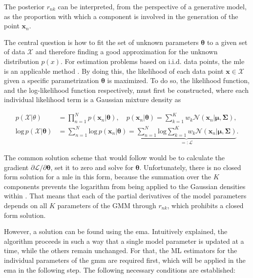 \documentclass[../../../main.tex]{subfiles}
\begin{document}
The posterior $r_{nk}$ can be interpreted, from the perspective of a generative model, as the proportion with which a component is involved in the generation of the point $\bm{x}_n$.

The central question is how to fit the set of unknown parameters $\bm{\theta}$ to a given set of data $\mathcal{X}$ and therefore finding a good approximation for the unknown distribution $p(x)$. For estimation problems based on i.i.d. data points, the \gls{mle} is an applicable method \cite[p. 317]{dei_2020}. By doing this, the likelihood of each data point $\bm{x} \in \mathcal{X}$ given a specific parametrization $\bm{\theta}$ is maximized. To do so, the likelihood function, and the log-likelihood function respectively, must first be constructed, where each individual likelihood term is a Gaussian mixture density as

\begin{equation*}
    \begin{aligned}
        p(\mathcal{X}|\theta) &= \prod\limits_{n=1}^Np(\bm{x}_n|\bm{\theta}), \quad p(\bm{x}_n|\bm{\theta})=\sum\limits^K_{k=1}w_k\mathcal{N}(\bm{x}_n| \bm{\mu}, \bm{\Sigma}),\\[5pt]
        \mathrm{log} \, p(\mathcal{X}|\bm{\theta}) &= \sum\limits_{n=1}^N \mathrm{log} \, p(\bm{x}_n|\bm{\theta}) = \underbrace{ \sum\limits_{n=1}^N \mathrm{log} \sum\limits_{k=1}^K w_k \mathcal{N}(\bm{x}_n | \bm{\mu}, \bm{\Sigma})}_{=:\mathcal{L}}.
    \end{aligned}
\end{equation*}

The common solution scheme that would follow would be to calculate the gradient $\partial{\mathcal{L}}/\partial{\bm{\theta}}$, set it to zero and solve for $\bm{\theta}$. Unfortunately, there is no closed form solution for a \gls{mle} in this form, because the summation over the $K$ components prevents the logarithm from being applied to the Gaussian densities within \cite[p. 435]{bis_2006}. That means that each of the partial derivatives of the model parameters depends on all $K$ parameters of the GMM through $r_{nk}$, which prohibits a closed form solution. 

However, a solution can be found using the \gls{ema}. Intuitively explained, the algorithm proceeds in such a way that a single model parameter is updated at a time, while the others remain unchanged. For that, the ML estimators for the individual parameters of the \gls{gmm} are required first, which will be applied in the \gls{ema} in the following step. The following necessary conditions are established:
\end{document}
